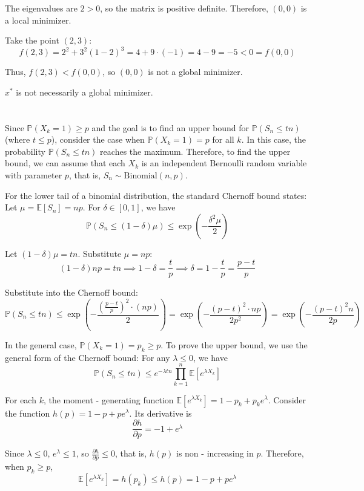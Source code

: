 \documentclass{article}
\begin{document}
The eigenvalues are \( 2 > 0 \), so the matrix is positive definite. Therefore, \( (0, 0) \) is a local minimizer.

Take the point \( (2, 3) \):
$$
f(2, 3) = 2^2 + 3^2(1 - 2)^3 = 4 + 9 \cdot (-1) = 4 - 9 = -5 < 0 = f(0, 0)
$$

Thus, \( f(2, 3) < f(0, 0) \), so \( (0, 0) \) is not a global minimizer.

\( x^* \) is not necessarily a global minimizer.

\section{}

Since $ \mathbb{P}(X_k = 1)\geq p $ and the goal is to find an upper bound for $ \mathbb{P}(S_n\leq tn) $ (where $ t\leq p $), consider the case when $ \mathbb{P}(X_k = 1)=p $ for all $ k $. In this case, the probability $ \mathbb{P}(S_n\leq tn) $ reaches the maximum. Therefore, to find the upper bound, we can assume that each $ X_k $ is an independent Bernoulli random variable with parameter $ p $, that is, $ S_n\sim \text{Binomial}(n,p) $.

For the lower tail of a binomial distribution, the standard Chernoff bound states: Let $ \mu=\mathbb{E}[S_n]=np $. For $ \delta\in[0,1] $, we have
$$
\mathbb{P}(S_n\leq(1 - \delta)\mu)\leq\exp\left(-\frac{\delta^2\mu}{2}\right)
$$

Let $ (1 - \delta)\mu = tn $. Substitute $ \mu = np $:
$$
(1 - \delta)np=tn\implies 1 - \delta=\frac{t}{p}\implies\delta = 1-\frac{t}{p}=\frac{p - t}{p}
$$

Substitute into the Chernoff bound:
$$
\mathbb{P}(S_n\leq tn)\leq\exp\left(-\frac{\left(\frac{p - t}{p}\right)^2\cdot(np)}{2}\right)=\exp\left(-\frac{(p - t)^2\cdot np}{2p^2}\right)=\exp\left(-\frac{(p - t)^2n}{2p}\right)
$$

In the general case, $ \mathbb{P}(X_k = 1)=p_k\geq p $. To prove the upper bound, we use the general form of the Chernoff bound: For any $ \lambda\leq0 $, we have
$$
\mathbb{P}(S_n\leq tn)\leq e^{-\lambda tn}\prod_{k = 1}^n\mathbb{E}[e^{\lambda X_k}]
$$

For each $ k $, the moment - generating function $ \mathbb{E}[e^{\lambda X_k}]=1 - p_k + p_ke^{\lambda} $. Consider the function $ h(p)=1 - p+pe^{\lambda} $. Its derivative is
$$
\frac{\partial h}{\partial p}=- 1+e^{\lambda}
$$

Since $ \lambda\leq0 $, $ e^{\lambda}\leq1 $, so $ \frac{\partial h}{\partial p}\leq0 $, that is, $ h(p) $ is non - increasing in $ p $. Therefore, when $ p_k\geq p $,
$$
\mathbb{E}[e^{\lambda X_k}]=h(p_k)\leq h(p)=1 - p + pe^{\lambda}
$$
\end{document}
